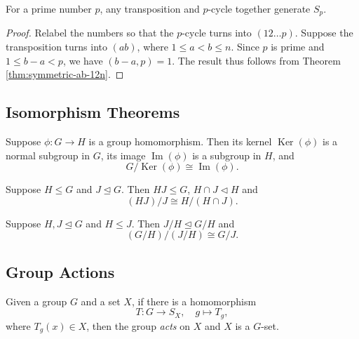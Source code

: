 \begin{theorem} \label{thm:symmetric-prime}
	For a prime number $p$, any transposition and $p$-cycle together generate $S_p$.
\end{theorem}
\begin{proof}
	Relabel the numbers so that the $p$-cycle turns into $(12 \dots p)$. Suppose the transposition turns into $(ab)$, where $1 \le a < b \le n$. Since $p$ is prime and $1 \le b - a < p$, we have $(b - a, p) = 1$. The result thus follows from Theorem \ref{thm:symmetric-ab-12n}.
\end{proof}

\subsection{Isomorphism Theorems}

\begin{theorem} \label{thm:first-iso}
	Suppose $\phi: G \to H$ is a group homomorphism. Then its kernel $\operatorname{Ker}(\phi)$ is a normal subgroup in $G$, its image $\operatorname{Im}(\phi)$ is a subgroup in $H$, and 
	$$
	G / \operatorname{Ker}(\phi) \cong \operatorname{Im}(\phi).
	$$
\end{theorem}

\begin{theorem} \label{thm:second-iso}
	Suppose $H \le G$ and $J \trianglelefteq G$. Then $HJ \le G$, $H \cap J \triangleleft H$ and $$
	(HJ) / J \cong H / (H \cap J). 
	$$
\end{theorem}
\begin{theorem} \label{thm:third-iso}
	Suppose $H, J \trianglelefteq G$ and $H \le J$. Then $J/H \trianglelefteq G/H$ and $$
	(G/H)/(J/H) \cong G / J.    $$
\end{theorem}



\subsection{Group Actions}



\begin{definition} \label{def:action}
	Given a group $G$ and a set $X$, if there is a homomorphism
	$$
	T: G \rightarrow S_X, \quad g \mapsto T_g,
	$$
	where $T_g(x) \in X$, then the group \textit{acts} on $X$ and $X$ is a $G$-set. 
\end{definition}

